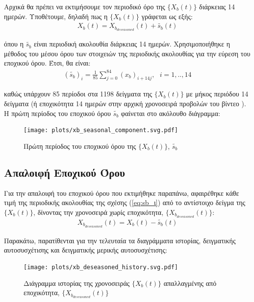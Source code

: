 Αρχικά θα πρέπει να εκτιμήσουμε τον περιοδικό όρο της $\{X_b(t)\}$ διάρκειας 14 ημερών. Υποθέτουμε, δηλαδή πως η $\{X_b(t)\}$ γράφεται ως εξής:
\begin{align}
    X_b(t) = X_{b_{deseasoned}}(t) + \widetilde{s_b}(t)
    \label{eq:xb=xb_ds+sb}
\end{align}

όπου η $\widetilde{s_b}$ είναι περιοδική ακολουθία διάρκειας 14 ημερών. Χρησιμοποιήθηκε η μέθοδος του μέσου όρου των στοιχειών της περιοδικής ακολουθίας για την εύρεση του εποχικού όρου. Έτσι, θα είναι:
\begin{align}
    \left(\widetilde{s_b}\right)_i = \frac{1}{85} \sum_{j=0}^{84} \left(x_b\right)_{i+14j} , \ \ \  i=1,..,14
    \label{eq:sb_ι}
\end{align}

καθώς υπάρχουν 85 περίοδοι στα 1198 δείγματα της $\{X_b(t)\}$ με μήκος περιόδου 14 δείγματα (ή εποχικότητα 14 ημερών στην αρχική χρονοσειρά προβολών του βίντεο ). Η πρώτη περίοδος του εποχικού όρου $\widetilde{s_b}$ φαίνεται στο ακόλουθο διάγραμμα:

\begin{figure}[H]
    \begin{center}
        \texttt{[image: plots/xb\_seasonal\_component.svg.pdf]}
        \caption{Πρώτη περίοδος του εποχικού όρου της $\{X_b(t)\}$, $\widetilde{s_b}$}
        \label{fig:xb_seasonal_component}
    \end{center}
\end{figure}

\subsection{Απαλοιφή Εποχικού Όρου}

Για την απαλοιφή του εποχικού όρου που εκτιμήθηκε παραπάνω, αφαιρέθηκε κάθε τιμή της περιοδικής ακολουθίας της σχέσης (\ref{eq:sb_ι}) από το αντίστοιχο δείγμα της $\{X_b(t)\}$,
δίνοντας την χρονοσειρά χωρίς εποχικότητα, $\{X_{b_{deseasoned}}(t)\}$:
\begin{align}
    X_{b_{deseasoned}}(t) = X_b(t) - \widetilde{s_b}(t)
    \label{eq:xb_ds_t}
\end{align}

\par Παρακάτω, παρατίθενται για την τελευταία τα διαγράμματα ιστορίας, δειγματικής αυτοσυσχέτισης και δειγματικής μερικής αυτοσυσχέτισης:

\begin{figure}[H]
    \begin{center}
        \texttt{[image: plots/xb\_deseasoned\_history.svg.pdf]}
        \caption{Διάγραμμα ιστορίας της χρονοσειράς $\{X_b(t)\}$ απαλλαγμένης από εποχικότητα, $\{X_{b_{deseasoned}}(t)\}$}
        \label{fig:xb_deseasoned_history}
    \end{center}
\end{figure}

